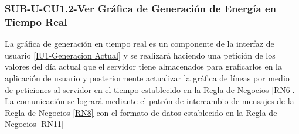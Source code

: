 \subsubsection{SUB-U-CU1.2-Ver Gráfica de Generación de Energía en Tiempo Real}\label{SUB-U-CU1.2}
La gráfica de generación en tiempo real es un componente de la interfaz de usuario \hyperref[fig:monitoreo]{[IU1-Generacion Actual]} y se realizará haciendo una petición de los valores del día actual que el servidor tiene almacenados para graficarlos en la aplicación de usuario y posteriormente actualizar la gráfica de líneas por medio de peticiones al servidor en el tiempo establecido en la Regla de Negocios \ref{RN6}.
\\ La comunicación se logrará mediante el patrón de intercambio de mensajes de la Regla de Negocios \ref{RN8} con el formato de datos establecido en la Regla de Negocios \ref{RN11}  

